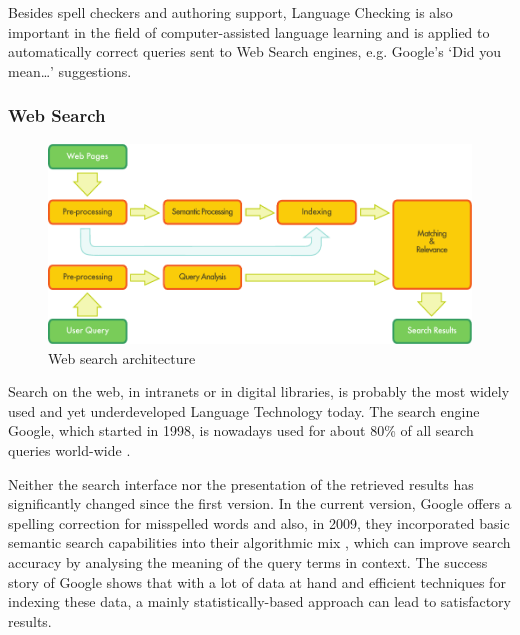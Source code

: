 \begin{multicols}{2}
Besides spell checkers and authoring support, Language Checking is also important in the field of computer-assisted language learning and is applied to automatically correct queries sent to Web Search engines, e.g. Google’s ‘Did you mean…’ suggestions. 

\subsubsection{Web Search}
\begin{figure}[htb]
  \center
  \includegraphics[width=\textwidth]{../_media/english/web_search_architecture}
  \caption{Web search architecture}
  \label{fig:websearcharch_en}
 \end{figure}
 
    Search on the web, in intranets or in digital libraries, is probably the most widely used and yet underdeveloped Language Technology today. The search engine Google, which started in 1998, is nowadays used for about 80\% of all search queries world-wide \cite{BAS-Nota27}.
 
Neither the search interface nor the presentation of the retrieved results has significantly changed since the first version. In the current version, Google offers a spelling correction for misspelled words and also, in 2009, they incorporated basic semantic search capabilities into their algorithmic mix \cite{BAS-Nota28}, which can improve search accuracy by analysing the meaning of the query terms in context. The success story of Google shows that with a lot of data at hand and efficient techniques for indexing these data, a mainly statistically-based approach can lead to satisfactory results.
 


\end{multicols}
